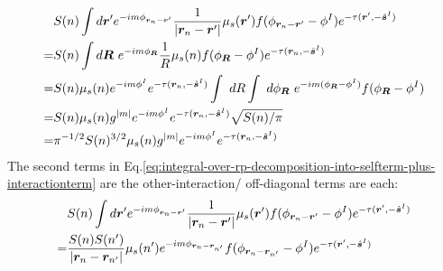 \documentclass [10pt,letterpaper]{article}
\newcommand{\unitvectorsym}[1]{\hat{\vectorsym{#1}}}
\begin{document}
\begin{equation} \label{eq:result-diagonal-Vscnm-1pt}
	\begin{split} 
		&
		S(n)
		\int d\vectorsym{r}^\prime
		e^{-i m \phi_{\vectorsym{r}_n-\vectorsym{r}^\prime}}
		\frac
		{1}
		{\lvert \vectorsym{r}_n-\vectorsym{r}^\prime \rvert}
		\mu_s(\vectorsym{r}^\prime)
		f(\phi_{\vectorsym{r}_n-\vectorsym{r}^\prime}-\phi^I)
		e^{-\tau(\vectorsym{r}^\prime,-\unitvectorsym{s}^I)} 
		\\
		=& 
		S(n)
		\int d\vectorsym{R}
		\ e^{-i m \phi_{\vectorsym{R}} }
		\frac
		{1}
		R
		\mu_s(n)
		f(\phi_{\vectorsym{R}}-\phi^I)
		e^{-\tau(\vectorsym{r}_n,-\unitvectorsym{s}^I)} 
		\\
		=& 
		S(n)
		\mu_s(n)
		e^{-i m \phi^I }
		e^{-\tau(\vectorsym{r}_n,-\unitvectorsym{s}^I)} 
		\int \ dR
		\int \ d\phi_{\vectorsym{R}}
		\ e^{-i m (\phi_{\vectorsym{R}} - \phi^I)}
		f(\phi_{\vectorsym{R}}-\phi^I)
		\\
		=& 
		S(n)
		\mu_s(n)
		g^{\lvert m \rvert}
		e^{-i m \phi^I }
		e^{-\tau(\vectorsym{r}_n,-\unitvectorsym{s}^I)} 
		\sqrt{S(n)/\pi}
		\\
		=& 
		\pi^{-1/2}
		S(n)^{3/2}
		\mu_s(n)
		g^{\lvert m \rvert}
		e^{-i m \phi^I }
		e^{-\tau(\vectorsym{r}_n,-\unitvectorsym{s}^I)} 
	\end{split}
\end{equation}
The second terms in Eq.\eqref{eq:integral-over-rp-decomposition-into-selfterm-plus-interactionterm} are the other-interaction/ off-diagonal terms are each:
\begin{equation} \label{eq:result-off-diagonal-Vscnm-1pt}
	\begin{split} 
		&
		S(n)
		\int d\vectorsym{r}^\prime
		e^{-i m \phi_{\vectorsym{r}_n-\vectorsym{r}^\prime}}
		\frac
		{1}
		{\lvert \vectorsym{r}_n-\vectorsym{r}^\prime \rvert}
		\mu_s(\vectorsym{r}^\prime)
		f(\phi_{\vectorsym{r}_n-\vectorsym{r}^\prime}-\phi^I)
		e^{-\tau(\vectorsym{r}^\prime,-\unitvectorsym{s}^I)} 
		\\
		=&
		\frac
		{S(n)S(n^\prime)}
		{\lvert \vectorsym{r}_n - \vectorsym{r}_{n^\prime} \rvert} 
		\mu_s(n^\prime)
		e^{-i m \phi_{\vectorsym{r}_n - \vectorsym{r}_{n^\prime}}}
		f(\phi_{\vectorsym{r}_n - \vectorsym{r}_{n^\prime}}-\phi^I)
		e^{-\tau(\vectorsym{r}^\prime,-\unitvectorsym{s}^I)}
	\end{split}
\end{equation}
\end{document}
